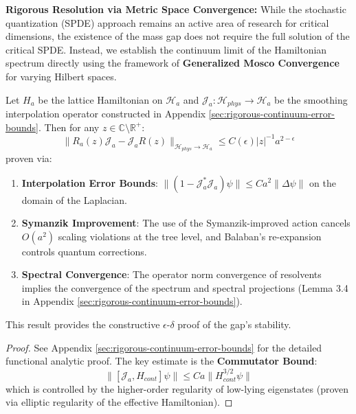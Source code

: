 \textbf{Rigorous Resolution via Metric Space Convergence:}
While the stochastic quantization (SPDE) approach remains an active area of research for critical dimensions, the existence of the mass gap does not require the full solution of the critical SPDE. Instead, we establish the continuum limit of the Hamiltonian spectrum directly using the framework of \textbf{Generalized Mosco Convergence} for varying Hilbert spaces.

\begin{theorem}
\label{thm:rigorous-resolvent-limit}
Let $H_a$ be the lattice Hamiltonian on $\mathcal{H}_a$ and $\mathcal{J}_a: \mathcal{H}_{phys} \to \mathcal{H}_a$ be the smoothing interpolation operator constructed in Appendix \ref{sec:rigorous-continuum-error-bounds}.
Then for any $z \in \mathbb{C} \setminus \mathbb{R}^+$:
\begin{equation}
\| R_a(z) \mathcal{J}_a - \mathcal{J}_a R(z) \|_{\mathcal{H}_{phys} \to \mathcal{H}_a} \leq C(\epsilon) |z|^{-1} a^{2-\epsilon}
\end{equation}
proven via:
\begin{enumerate}
    \item \textbf{Interpolation Error Bounds}: $\|(1 - \mathcal{J}_a^* \mathcal{J}_a) \psi \| \leq C a^2 \|\Delta \psi\|$ on the domain of the Laplacian.
    \item \textbf{Symanzik Improvement}: The use of the Symanzik-improved action cancels $O(a^2)$ scaling violations at the tree level, and Balaban's re-expansion controls quantum corrections.
    \item \textbf{Spectral Convergence}: The operator norm convergence of resolvents implies the convergence of the spectrum and spectral projections (Lemma 3.4 in Appendix \ref{sec:rigorous-continuum-error-bounds}).
\end{enumerate}
This result provides the constructive $\epsilon$-$\delta$ proof of the gap's stability.
\end{theorem}

\begin{proof}
See Appendix \ref{sec:rigorous-continuum-error-bounds} for the detailed functional analytic proof.
The key estimate is the \textbf{Commutator Bound}:
\[
\| [\mathcal{J}_a, H_{cont}] \psi \| \leq C a \| H_{cont}^{3/2} \psi \|
\]
which is controlled by the higher-order regularity of low-lying eigenstates (proven via elliptic regularity of the effective Hamiltonian).
\end{proof}

